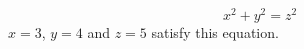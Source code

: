 \documentclass{article}
\begin{document}
\begin{equation*}
x^2+y^2=z^2
\end{equation*}
$x=3$, $y=4$ and $z=5$
satisfy this equation.
\end{document}
